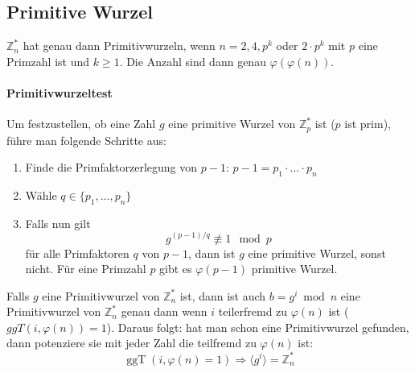 \documentclass[8pt,a4paper,landscape]{article}
\begin{document}
\begin{multicols}{4}
\subsection{Primitive Wurzel}
\(\mathbb{Z}_{n}^{*}\) hat genau dann Primitivwurzeln,  wenn 
\(n = 2,4, p^{k}\) oder \(2 \cdot p^{k}\) mit \(p\) eine Primzahl ist und \(k \geq 1\). Die Anzahl sind dann genau \(\varphi(\varphi(n))\).

\paragraph{Primitivwurzeltest} Um festzustellen, ob eine Zahl $g$ eine primitive Wurzel von 
$\mathbb{Z}_{p}^{*}$ ist ($p$ ist prim), führe man folgende Schritte aus:
\begin{enumerate}
\item Finde die Primfaktorzerlegung von $p-1$: \( p-1=p_{1} \cdot \ldots \cdot  p_{n}\)
\item Wähle \(q \in \{p_{1}, \ldots,p_{n}\}\)
\item Falls nun gilt
\[
    \boxed{ g^{(p-1)/q} \not\equiv 1 \mod p }
\]
für alle Primfaktoren $q$ von $p-1$, dann ist $g$ eine primitive Wurzel,
sonst nicht. Für eine Primzahl $p$ gibt es $\varphi(p-1)$ primitive Wurzel.
\end{enumerate}
Falls $g$ eine Primitivwurzel von $\mathbb{Z}_{n}^{*}$ ist, dann ist auch 
$b = g^{i} \bmod n$ eine Primitivwurzel von $\mathbb{Z}_{n}^{*}$ genau dann 
wenn $i$ teilerfremd zu $\varphi(n)$ ist ($ggT(i, \varphi(n)) = 1$). Daraus folgt:
hat man schon eine Primitivwurzel gefunden, dann potenziere sie mit jeder Zahl die teilfremd zu $\varphi(n)$ ist:
\[
    \operatorname{ggT}(i, \varphi(n) = 1) \Rightarrow
    \langle g^{i} \rangle = \mathbb{Z}_{n}^{*}
\]


\end{multicols}
\end{document}
